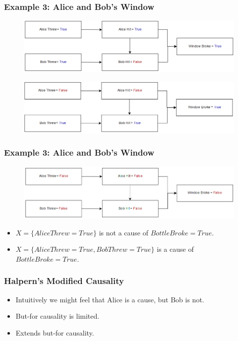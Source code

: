 \documentclass{beamer}
\theoremstyle{plain}
\theoremstyle{definition}
\begin{document}
\begin{frame}
\frametitle{Example 3: Alice and Bob's Window}
\begin{figure}
\includegraphics[scale=.4]{alicebobModelReal}
\end{figure}

\begin{figure}
\includegraphics[scale=.4]{alicebobModelCounterfactual}
\end{figure}
\end{frame}

\begin{frame}
\frametitle{Example 3: Alice and Bob's Window}
\begin{figure}
\includegraphics[scale=.4]{alicebobModelCounterfactual2}
\end{figure}

\begin{itemize}
\item $X = \{Alice Threw = True\}$ is not a cause of $Bottle Broke = True$.
\item $X = \{Alice Threw = True, Bob Threw = True\}$ is a cause of $Bottle Broke = True$.
\end{itemize}
\end{frame}



\begin{frame}
\frametitle{Halpern's Modified Causality}
\begin{itemize}
\item Intuitively we might feel that Alice is a cause, but Bob is not.
\item But-for causality is limited.
\item Extends but-for causality.
\end{itemize}

\end{frame}
\end{document}
